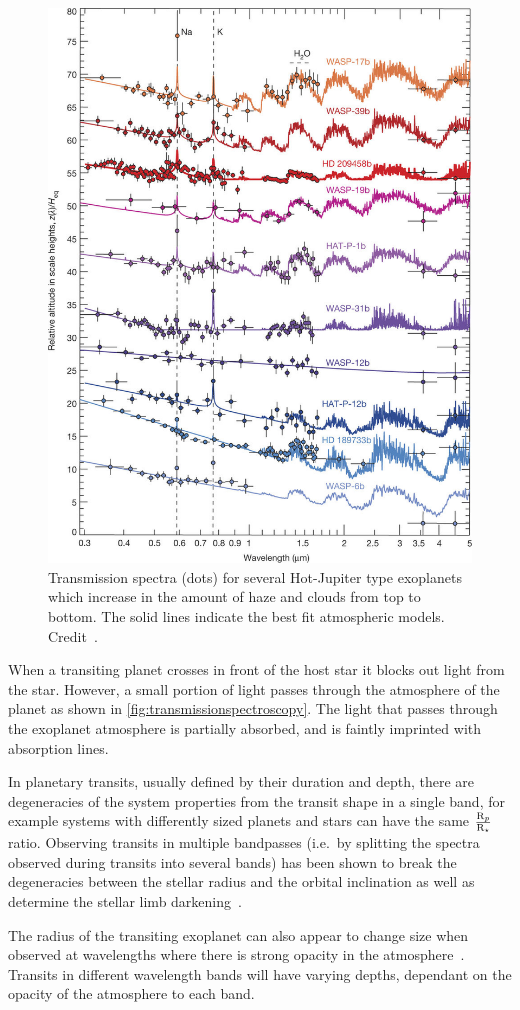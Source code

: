 \begin{figure}
    \centering
    \includegraphics[width=0.6\linewidth]{figures/introduction/transmissionSpec_Sing2016}
    \caption[Transmission spectra for several Hot-Jupiter exoplanets.]{Transmission spectra (dots) for several Hot-Jupiter type exoplanets which increase in the amount of haze and clouds from top to bottom.
    The solid lines indicate the best fit atmospheric models.
    Credit~\citet{sing_continuum_2016}.}
    \label{fig:transmissionspecsing2016}
\end{figure}

When a transiting planet crosses in front of the host star it blocks out light from the star.
However, a small portion of light passes through the atmosphere of the planet as shown in \cref{fig:transmissionspectroscopy}.
The light that passes through the exoplanet atmosphere is partially absorbed, and is faintly imprinted with absorption lines.


In planetary transits, usually defined by their duration and depth, there are degeneracies of the system properties from the transit shape in a single band, for example systems with differently sized planets and stars can have the same \(\frac{\textrm{R}_{p}}{\textrm{R}_{\star}}\) ratio.
Observing transits in multiple bandpasses (i.e.\ by splitting the spectra observed during transits into several bands) has been shown to break the degeneracies between the stellar radius and the orbital inclination as well as determine the stellar limb darkening~\citep{jha_multicolor_2000, knutson_using_2007}.

The radius of the transiting exoplanet can also appear to change size when observed at wavelengths where there is strong opacity in the atmosphere~\citep[e.g.][]{burrows_radii_2000, seager_theoretical_2000}.
Transits in different wavelength bands will have varying depths, dependant on the opacity of the atmosphere to each band.

